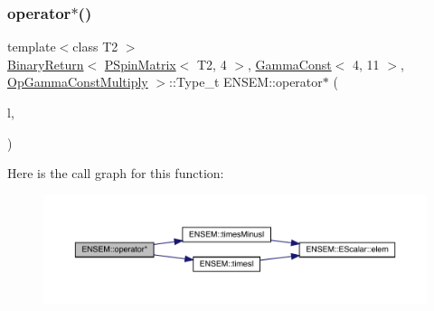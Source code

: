 \subsubsection{\texorpdfstring{operator$\ast$()}{operator*()}\hspace{0.1cm}{\footnotesize\ttfamily [28/64]}}
{\footnotesize\ttfamily template$<$class T2 $>$ \\
\mbox{\hyperlink{structENSEM_1_1BinaryReturn}{Binary\+Return}}$<$ \mbox{\hyperlink{classENSEM_1_1PSpinMatrix}{P\+Spin\+Matrix}}$<$ T2, 4 $>$, \mbox{\hyperlink{classENSEM_1_1GammaConst}{Gamma\+Const}}$<$ 4, 11 $>$, \mbox{\hyperlink{structENSEM_1_1OpGammaConstMultiply}{Op\+Gamma\+Const\+Multiply}} $>$\+::Type\+\_\+t E\+N\+S\+E\+M\+::operator$\ast$ (\begin{DoxyParamCaption}\item[{const \mbox{\hyperlink{classENSEM_1_1PSpinMatrix}{P\+Spin\+Matrix}}$<$ T2, 4 $>$ \&}]{l,  }\item[{const \mbox{\hyperlink{classENSEM_1_1GammaConst}{Gamma\+Const}}$<$ 4, 11 $>$ \&}]{ }\end{DoxyParamCaption})\hspace{0.3cm}{\ttfamily [inline]}}

Here is the call graph for this function\+:\nopagebreak
\begin{figure}[H]
\begin{center}
\leavevmode
\includegraphics[width=350pt]{d6/df5/group__primspinmatrix_gaaf604778bbb015bcd9e40d133993fda3_cgraph}
\end{center}
\end{figure}
\mbox{\label{group__primspinmatrix_ga8c42140341467357377e412313e01a3c}} 
